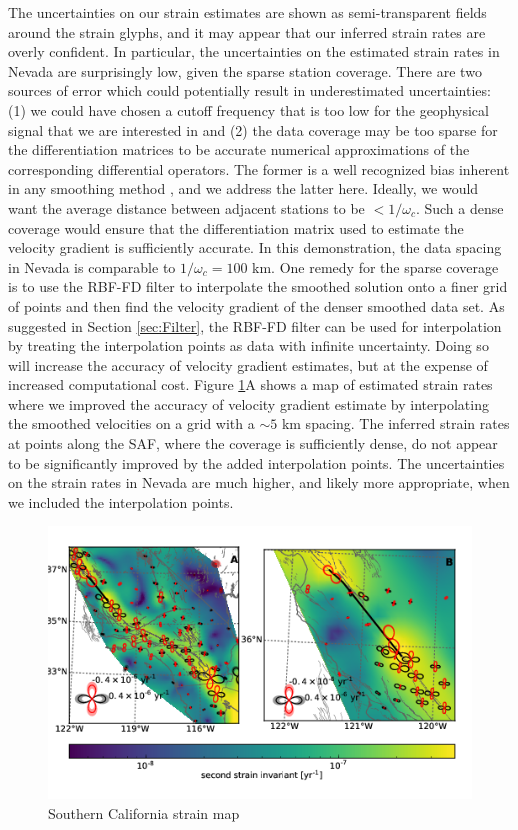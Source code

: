 \documentclass[10pt,a4paper]{article}
\begin{document}
The uncertainties on our strain estimates are shown as semi-transparent fields around the strain glyphs, and it may appear that our inferred strain rates are overly confident. In particular, the uncertainties on the estimated strain rates in Nevada are surprisingly low, given the sparse station coverage.  There are two sources of error which could potentially result in underestimated uncertainties: (1) we could have chosen a cutoff frequency that is too low for the geophysical signal that we are interested in and (2) the data coverage may be too sparse for the differentiation matrices to be accurate numerical approximations of the corresponding differential operators. The former is a well recognized bias inherent in any smoothing method \citep{Hastie1990}, and we address the latter here. Ideally, we would want the average distance between adjacent stations to be ${<}1/\omega_c$. Such a dense coverage would ensure that the differentiation matrix used to estimate the velocity gradient is sufficiently accurate. In this demonstration, the data spacing in Nevada is comparable to $1/\omega_c=100$ km. One remedy for the sparse coverage is to use the RBF-FD filter to interpolate the smoothed solution onto a finer grid of points and then find the velocity gradient of the denser smoothed data set. As suggested in Section \ref{sec:Filter}, the RBF-FD filter can be used for interpolation by treating the interpolation points as data with infinite uncertainty. Doing so will increase the accuracy of velocity gradient estimates, but at the expense of increased computational cost.  Figure \ref{fig:SoCal2}A shows a map of estimated strain rates where we improved the accuracy of velocity gradient estimate by interpolating the smoothed velocities on a grid with a ${\sim}5$ km spacing.  The inferred strain rates at points along the SAF, where the coverage is sufficiently dense, do not appear to be significantly improved by the added interpolation points. The uncertainties on the strain rates in Nevada are much higher, and likely more appropriate, when we included the interpolation points.

\begin{figure}
\includegraphics[scale=1.0]{figures/figure6.png}
\caption{Southern California strain map}   
\label{fig:SoCal2}
\end{figure}
\end{document}
